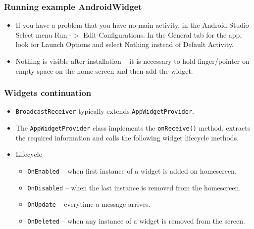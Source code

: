 \documentclass[10pt,xcolor=pdflatex]{beamer}
\begin{document}
\begin{frame}\frametitle{Running example AndroidWidget}
	\begin{itemize}
      \item If you have a problem that you have no main activity, in the Android Studio Select menu Run -$>$ Edit Configurations. In the General tab for the app, look for Launch Options and select Nothing instead of Default Activity.
      \item Nothing is visible after installation -- it is necessary to hold finger/pointer on empty space on the home screen and then add the widget.
    \end{itemize}
\end{frame}


\begin{frame}[fragile]\frametitle{Widgets continuation}
	\def\itm[#1]{\item\texttt{#1} -- }
	\begin{itemize}
		\item \texttt{BroadcastReceiver} typically extends \texttt{AppWidgetProvider}.
		\item The \texttt{AppWidgetProvider} class implements the \texttt{onReceive()} method, extracts the required information and calls the following widget lifecycle methods.
		\item Lifecycle
          \begin{itemize}
        	\itm[OnEnabled]when first instance of a widget is added on homescreen.
			\itm[OnDisabled]when the last instance is removed from the homescreen.
			\itm[OnUpdate]everytime a message arrives.
			\itm[OnDeleted]when any instance of a widget is removed from the screen.
          \end{itemize}
	\end{itemize}
\end{frame}
\end{document}
